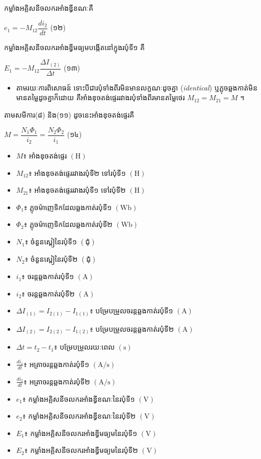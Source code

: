 កម្លាំងអគ្គិសនីចលករអាំងឌ្វីខណៈគឺ
\begin{center}
	$\boxed{e_1 = -M_{12} \dfrac{di_2}{dt}}$ \quad (១២)
\end{center}

កម្លាំងអគ្គិសនីចលករអាំងឌ្វីមធ្យមបង្កើតនៅក្នុងរបុំទី១ គឺ
\begin{center}
	$\boxed{E_1 = -M_{12} \dfrac{\Delta I_{(2)}}{\Delta t}}$ \quad (១៣)
\end{center}

\begin{itemize}[itemsep=2pt, topsep=4pt, parsep=0pt, leftmargin=1.6em]
	\item តាមរយៈការពិសោធន៍ ទោះបីជារបុំទាំងពីរមិនមានលក្ខណៈដូចគ្នា (\textit{identical}) ឬភ្លុចឆ្លងកាត់មិនមានតម្លៃដូចគ្នាក៏ដោយ គឺអាំងឌុចតង់ផ្ទេររវាងរបុំទាំងពីរមានតម្លៃថេរ $M_{12} = M_{21} = M$ ។
\end{itemize}

តាមសមីការ(៨) និង(១១) ដូចនេះអាំងឌុចតង់ផ្ទេរគឺ
\begin{center}
	$\boxed{M = \dfrac{N_1\Phi_1}{i_2} = \dfrac{N_2\Phi_2}{i_1}}$ \quad (១៤)
\end{center}

\begin{itemize}[itemsep=2pt, topsep=4pt, parsep=0pt, leftmargin=1.6em]
	\item $M$៖ អាំងឌុចតង់ផ្ទេរ $(\text{H})$
	\item $M_{12}$៖ អាំងឌុចតង់ផ្ទេររវាងរបុំទី២ ទៅរបុំទី១ $(\text{H})$
	\item $M_{21}$៖ អាំងឌុចតង់ផ្ទេររវាងរបុំទី១ ទៅរបុំទី២ $(\text{H})$
	\item $\Phi_1$៖ ភ្លុចម៉ាញេទិកដែលឆ្លងកាត់របុំទី១ $(\text{Wb})$
	\item $\Phi_2$៖ ភ្លុចម៉ាញេទិកដែលឆ្លងកាត់របុំទី២ $(\text{Wb})$
	\item $N_1$៖ ចំនួនស្ពៀនៃរបុំទី១ $(\text{ជុំ})$
	\item $N_2$៖ ចំនួនស្ពៀនៃរបុំទី២ $(\text{ជុំ})$
	\item $i_1$៖ ចរន្តឆ្លងកាត់របុំទី១ $(\text{A})$
	\item $i_2$៖ ចរន្តឆ្លងកាត់របុំទី២ $(\text{A})$
	\item $\Delta I_{(1)} = I_{2(1)} - I_{1(1)}$៖ បម្រែបម្រួលចរន្តឆ្លងកាត់របុំទី១ $(\text{A})$
	\item $\Delta I_{(2)} = I_{2(2)} - I_{1(2)}$៖ បម្រែបម្រួលចរន្តឆ្លងកាត់របុំទី២ $(\text{A})$
	\item $\Delta t = t_2 - t_1$៖ បម្រែបម្រួលរយៈពេល $(\text{s})$
	\item $\frac{di_1}{dt}$៖ អត្រាចរន្តឆ្លងកាត់របុំទី១ $(\text{A/s})$
	\item $\frac{di_2}{dt}$៖ អត្រាចរន្តឆ្លងកាត់របុំទី២ $(\text{A/s})$
	\item $e_1$៖ កម្លាំងអគ្គិសនីចលករអាំងឌ្វីខណៈនៃរបុំទី១ $(\text{V})$
	\item $e_2$៖ កម្លាំងអគ្គិសនីចលករអាំងឌ្វីខណៈនៃរបុំទី២ $(\text{V})$
	\item $E_1$៖ កម្លាំងអគ្គិសនីចលករអាំងឌ្វីមធ្យមនៃរបុំទី១ $(\text{V})$
	\item $E_2$៖ កម្លាំងអគ្គិសនីចលករអាំងឌ្វីមធ្យមនៃរបុំទី២ $(\text{V})$
\end{itemize}

